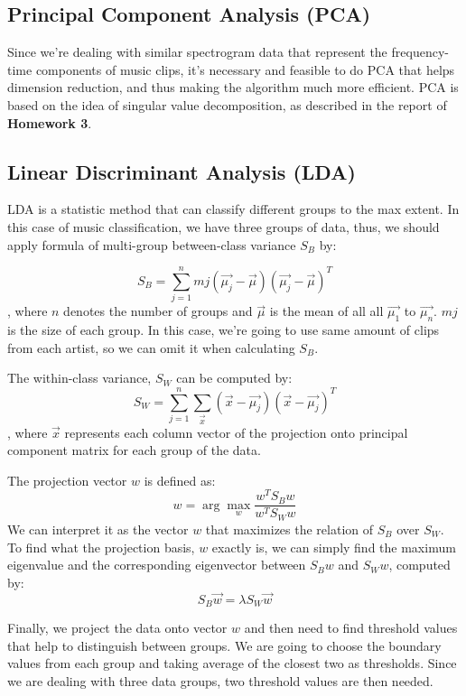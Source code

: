 \documentclass[10pt]{article}
\begin{document}
\subsection{Principal Component Analysis (PCA)}
Since we're dealing with similar spectrogram data that represent the frequency-time components of music clips, it's necessary and feasible to do PCA that helps dimension reduction, and thus making the algorithm much more efficient. PCA is based on the idea of singular value decomposition, as described in the report of \textbf{Homework 3}.


\subsection{Linear Discriminant Analysis (LDA)}
LDA is a statistic method that can classify different groups to the max extent. In this case of music classification, we have three groups of data, thus, we should apply formula of multi-group between-class variance $S_B$ by:

\begin{equation}\label{2}
S_B = \sum_{j=1}^{n}mj(\vec{\mu_j}-\vec{\mu})(\vec{\mu_j}-\vec{\mu})^T
\end{equation}
, where $n$ denotes the number of groups and $\vec{\mu}$ is the mean of all all $\vec{\mu_1}$ to $\vec{\mu_n}$. $mj$ is the size of each group. In this case, we're going to use same amount of clips from each artist, so we can omit it when calculating $S_B$.

\par
\vskip 0.1cm

The within-class variance, $S_W$ can be computed by:
\begin{equation}\label{3}
S_W = \sum_{j=1}^{n} \sum_{\vec{x}} (\vec{x}-\vec{\mu_j})(\vec{x}-\vec{\mu_j})^T
\end{equation}
, where $\vec{x}$ represents each column vector of the projection onto principal component matrix for each group of the data.

\par
\vskip 0.1cm

The projection vector $w$ is defined as:
\begin{equation}\label{4}
w = \arg\max_{w}\frac{w^TS_Bw}{w^TS_Ww}
\end{equation}
We can interpret it as the vector $w$ that maximizes the relation of $S_B$ over $S_W$. To find what the projection basis, $w$ exactly is, we can simply find the maximum eigenvalue and the corresponding eigenvector between $S_Bw$ and $S_Ww$, computed by:
\begin{equation}\label{5}
S_B\vec{w}=\lambda S_W\vec{w}
\end{equation}
\par
\vskip 0.1cm
Finally, we project the data onto vector $w$ and then need to find threshold values that help to distinguish between groups. We are going to choose the boundary values from each group and taking average of the closest two as thresholds. Since we are dealing with three data groups, two threshold values are then needed.
\end{document}

